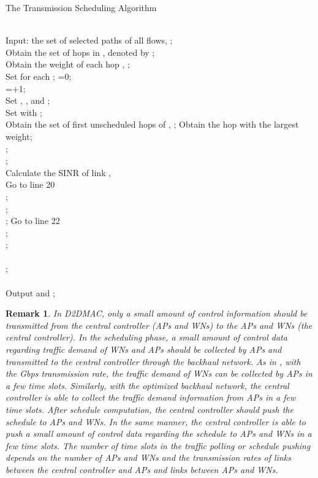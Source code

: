 \documentclass[journal]{IEEEtran}
\newtheorem{remark}{Remark}
\begin{document}
\begin{algorithm}[htbp]
\caption{The Transmission Scheduling Algorithm} \label{alg:BAD}
\begin{algorithmic}[1]
\REQUIRE ~~\\
 Input: the set of selected paths of all flows, ; \\
 Obtain the set of hops in , denoted by ; \\
Obtain the weight of each hop , ;\\
 Set  for each ; =0;
\ENSURE ~~\\
\WHILE {()}
\STATE  =+1;  \\
\STATE  Set , , and ; \\
\STATE Set  with ; \\
\STATE Obtain the set of first unscheduled hops of , ;
\STATE Obtain the hop  with the largest weight;\\
\STATE  ; \\\STATE ;\\
\STATE  Calculate the SINR of link , \\
\IF {()}
\STATE  Go to line 20\\
\ENDIF \ENDFOR
\STATE    ; \\
\STATE ;\\
\STATE ; Go to line 22\\
\STATE   ; \\ \STATE ;\\
\ENDIF\\
\STATE ;\\
\ENDWHILE\\

 \STATE Output  and ;\\
\ENDWHILE

\end{algorithmic}
\end{algorithm}

\begin{remark}

In D2DMAC, only a small amount of control information should be transmitted from the central controller (APs and WNs) to the APs and WNs (the central controller). In the scheduling phase, a small amount of control data regarding traffic demand of WNs and APs should be collected by APs and transmitted to the central controller through the backhaul network. As in \cite{mao}, with the Gbps transmission rate, the traffic demand of WNs can be collected by APs in a few time slots. Similarly, with the optimized backhaul network, the central controller is able to collect the traffic demand information from APs in a few time slots. After schedule computation, the central controller should push the schedule to APs and WNs. In the same manner, the central controller is able to push a small amount of control data regarding the schedule to APs and WNs in a few time slots. The number of time slots in the traffic polling or schedule pushing depends on the number of APs and WNs and the transmission rates of links between the central controller and APs and links between APs and WNs.




\end{remark}
\end{document}
